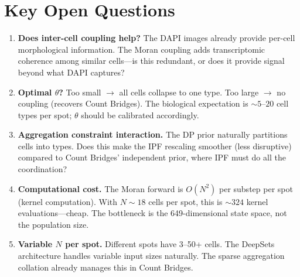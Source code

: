 \documentclass[11pt]{article}
\begin{document}
\section{Key Open Questions}

\begin{enumerate}
  \item \textbf{Does inter-cell coupling help?} The DAPI images already provide per-cell morphological information. The Moran coupling adds transcriptomic coherence among similar cells---is this redundant, or does it provide signal beyond what DAPI captures?

  \item \textbf{Optimal $\theta$?} Too small $\to$ all cells collapse to one type. Too large $\to$ no coupling (recovers Count Bridges). The biological expectation is ${\sim}5$--$20$ cell types per spot; $\theta$ should be calibrated accordingly.

  \item \textbf{Aggregation constraint interaction.} The DP prior naturally partitions cells into types. Does this make the IPF rescaling smoother (less disruptive) compared to Count Bridges' independent prior, where IPF must do all the coordination?

  \item \textbf{Computational cost.} The Moran forward is $O(N^2)$ per substep per spot (kernel computation). With $N \sim 18$ cells per spot, this is ${\sim}324$ kernel evaluations---cheap. The bottleneck is the 649-dimensional state space, not the population size.

  \item \textbf{Variable $N$ per spot.} Different spots have 3--50+ cells. The DeepSets architecture handles variable input sizes naturally. The sparse aggregation collation already manages this in Count Bridges.
\end{enumerate}
\end{document}
